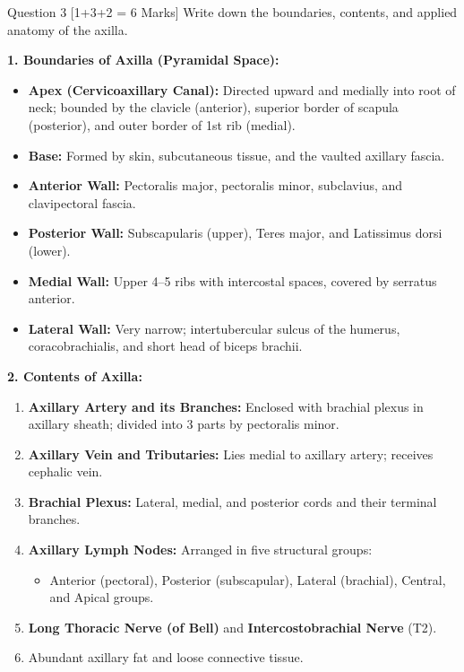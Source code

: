 \documentclass[11pt,a4paper]{article}
\begin{document}
\begin{qbox}{Question 3 [1+3+2 = 6 Marks]}
Write down the boundaries, contents, and applied anatomy of the axilla.
\end{qbox}

\begin{ansbox}
\textbf{1. Boundaries of Axilla (Pyramidal Space):}
\begin{itemize}[leftmargin=*]
    \item \textbf{Apex (Cervicoaxillary Canal):} Directed upward and medially into root of neck; bounded by the clavicle (anterior), superior border of scapula (posterior), and outer border of 1st rib (medial).
    \item \textbf{Base:} Formed by skin, subcutaneous tissue, and the vaulted axillary fascia.
    \item \textbf{Anterior Wall:} Pectoralis major, pectoralis minor, subclavius, and clavipectoral fascia.
    \item \textbf{Posterior Wall:} Subscapularis (upper), Teres major, and Latissimus dorsi (lower).
    \item \textbf{Medial Wall:} Upper 4--5 ribs with intercostal spaces, covered by serratus anterior.
    \item \textbf{Lateral Wall:} Very narrow; intertubercular sulcus of the humerus, coracobrachialis, and short head of biceps brachii.
\end{itemize}

\textbf{2. Contents of Axilla:}
\begin{enumerate}[leftmargin=*]
    \item \textbf{Axillary Artery and its Branches:} Enclosed with brachial plexus in axillary sheath; divided into 3 parts by pectoralis minor.
    \item \textbf{Axillary Vein and Tributaries:} Lies medial to axillary artery; receives cephalic vein.
    \item \textbf{Brachial Plexus:} Lateral, medial, and posterior cords and their terminal branches.
    \item \textbf{Axillary Lymph Nodes:} Arranged in five structural groups:
    \begin{itemize}
        \item Anterior (pectoral), Posterior (subscapular), Lateral (brachial), Central, and Apical groups.
    \end{itemize}
    \item \textbf{Long Thoracic Nerve (of Bell)} and \textbf{Intercostobrachial Nerve} (T2).
    \item Abundant axillary fat and loose connective tissue.
\end{enumerate}


\end{ansbox}
\end{document}

